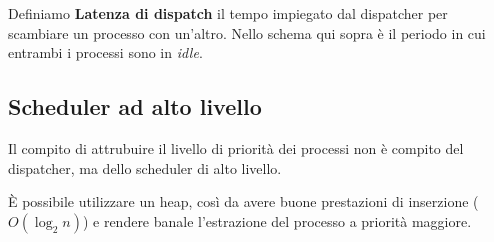 Definiamo \textbf{Latenza di dispatch} il tempo impiegato dal dispatcher per scambiare un processo con un'altro. Nello schema qui sopra è il periodo in cui entrambi i processi sono in \textit{idle}.

\subsection{Scheduler ad alto livello}
Il compito di attrubuire il livello di priorità dei processi non è compito del dispatcher, ma dello scheduler di alto livello.

È possibile utilizzare un heap, così da avere buone prestazioni di inserzione ($O(\log_2 n)$) e rendere banale l'estrazione del processo a priorità maggiore.

